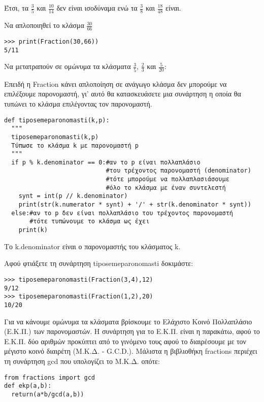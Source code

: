 Έτσι, τα $\frac{3}{5}$ και $\frac{10}{14}$ δεν είναι ισοδύναμα ενώ τα $\frac{3}{8}$ και $\frac{18}{48}$ είναι.

\begin{exercise}Να απλοποιηθεί το κλάσμα $\frac{30}{66}$
\end{exercise}

\begin{lstlisting}
>>> print(Fraction(30,66))
5/11
\end{lstlisting}

\begin{exercise}Να μετατραπούν σε ομώνυμα τα κλάσματα $\frac{3}{5}$, $\frac{2}{3}$ και $\frac{5}{20}$:
\end{exercise}

Επειδή η Fraction κάνει απλοποίηση σε ανάγωγο κλάσμα δεν μπορούμε να επιλέξουμε παρονομαστή, γι' αυτό θα κατασκευάσετε μια συνάρτηση η οποία θα τυπώνει το κλάσμα επιλέγοντας τον παρονομαστή.

\begin{lstlisting}
def tiposemeparonomasti(k,p):
  """
  tiposemeparonomasti(k,p)
  Τύπωσε το κλάσμα k με παρονομαστή p
  """
  if p % k.denominator == 0:#αν το p είναι πολλαπλάσιο
                            #του τρέχοντος παρονομαστή (denominator)
                            #τότε μπορούμε να πολλαπλασιάσουμε
                            #όλο το κλάσμα με έναν συντελεστή
    synt = int(p // k.denominator)
    print(str(k.numerator * synt) + '/' + str(k.denominator * synt))
  else:#αν το p δεν είναι πολλαπλάσιο του τρέχοντος παρονομαστή
       #τότε τυπώνουμε το κλάσμα ως έχει
    print(k)
\end{lstlisting}

Το k.denominator είναι ο παρονομαστής του κλάσματος k.

Αφού φτιάξετε τη συνάρτηση tiposemeparonomasti δοκιμάστε:
\begin{lstlisting}
>>> tiposemeparonomasti(Fraction(3,4),12)
9/12
>>> tiposemeparonomasti(Fraction(1,2),20)
10/20
\end{lstlisting}

Για να κάνουμε ομώνυμα τα κλάσματα βρίσκουμε το Ελάχιστο Κοινό Πολλαπλάσιο (Ε.Κ.Π.) των παρονομαστών. 
Η συνάρτηση για το Ε.Κ.Π. είναι η παρακάτω, αφού το Ε.Κ.Π. δύο αριθμών προκύπτει από το γινόμενο τους αφού το διαιρέσουμε με τον μέγιστο κοινό διαιρέτη (Μ.Κ.Δ. - G.C.D.). Μάλιστα η βιβλιοθήκη fractions περιέχει τη συνάρτηση gcd που υπολογίζει το Μ.Κ.Δ. οπότε:
\begin{lstlisting}
from fractions import gcd
def ekp(a,b):
  return(a*b/gcd(a,b))
\end{lstlisting}

